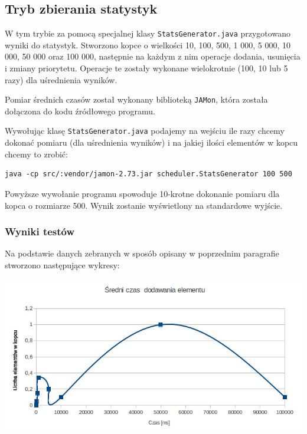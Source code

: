 \documentclass[12pt,a4paper]{article}
\begin{document}
\subsection{Tryb zbierania statystyk}

W tym trybie za pomocą specjalnej klasy \texttt{StatsGenerator.java} przygotowano wyniki do statystyk.
Stworzono kopce o wielkości 10, 100, 500, 1 000, 5 000, 10 000, 50 000  oraz 100 000, następnie na każdym z nim operacje dodania, usunięcia i zmiany priorytetu. Operacje te zostały wykonane wielokrotnie (100, 10 lub 5 razy) dla uśrednienia wyników.

Pomiar średnich czasów został wykonany biblioteką \texttt{JAMon}, która została dołączona do kodu źródłowego programu.

Wywołując klasę \texttt{StatsGenerator.java} podajemy na wejściu ile razy chcemy dokonać pomiaru (dla uśrednienia wyników) i na jakiej ilości elementów w kopcu chcemy to zrobić:

\begin{lstlisting}
java -cp src/:vendor/jamon-2.73.jar scheduler.StatsGenerator 100 500
\end{lstlisting}

Powyższe wywołanie programu spowoduje 10-krotne dokonanie pomiaru dla kopca o rozmiarze 500. Wynik zostanie wyświetlony na standardowe wyjście.

\subsubsection{Wyniki testów}

Na podstawie danych zebranych w sposób opisany w poprzednim paragrafie stworzono następujące wykresy:

	\includegraphics[scale=0.5]{img/add.jpg} 
\end{document}
